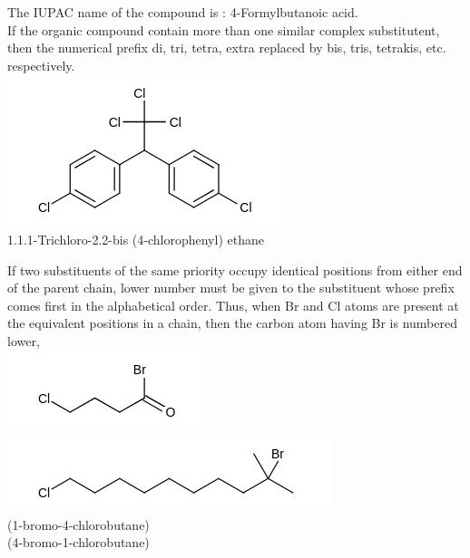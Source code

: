 \documentclass[10pt]{article}
\begin{document}
The IUPAC name of the compound is : 4-Formylbutanoic acid.\\
If the organic compound contain more than one similar complex substitutent, then the numerical prefix di, tri, tetra, extra replaced by bis, tris, tetrakis, etc. respectively.\\
\includegraphics{smile-5b7bf5aea28dcb2fe370c0cf80f6e57611ff4b91}\\
1.1.1-Trichloro-2.2-bis (4-chlorophenyl) ethane

If two substituents of the same priority occupy identical positions from either end of the parent chain, lower number must be given to the substituent whose prefix comes first in the alphabetical order. Thus, when Br and Cl atoms are present at the equivalent positions in a chain, then the carbon atom having Br is numbered lower,\\
\includegraphics{smile-0dbcff1d44985893637bb3458456479c7835f9a2}\\
\includegraphics{smile-636c2e7e8cd4ec0c3c959f1f7c439d871b60e251}\\
(1-bromo-4-chlorobutane)\\
(4-bromo-1-chlorobutane)
\end{document}
